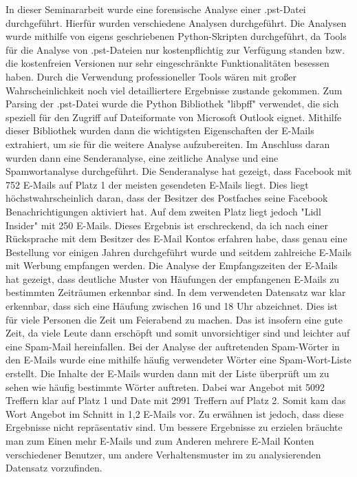 In dieser Seminararbeit wurde eine forensische Analyse einer .pst-Datei durchgeführt. Hierfür wurden verschiedene Analysen durchgeführt. Die Analysen wurde mithilfe von eigens geschriebenen Python-Skripten durchgeführt, da Tools für die Analyse von .pst-Dateien nur kostenpflichtig zur Verfügung standen bzw. die kostenfreien Versionen nur sehr eingeschränkte Funktionalitäten besessen haben. Durch die Verwendung professioneller Tools wären mit großer Wahrscheinlichkeit noch viel detailliertere Ergebnisse zustande gekommen. Zum Parsing der .pst-Datei wurde die Python Bibliothek "libpff" verwendet, die sich speziell für den Zugriff auf Dateiformate von Microsoft Outlook eignet. Mithilfe dieser Bibliothek wurden dann die wichtigsten Eigenschaften der E-Mails extrahiert, um sie für die weitere Analyse aufzubereiten. \newline
Im Anschluss daran wurden dann eine Senderanalyse, eine zeitliche Analyse und eine Spamwortanalyse durchgeführt. Die Senderanalyse hat gezeigt, dass Facebook mit 752 E-Mails auf Platz 1 der meisten gesendeten E-Mails liegt. Dies liegt höchstwahrscheinlich daran, dass der Besitzer des Postfaches seine Facebook Benachrichtigungen aktiviert hat. Auf dem zweiten Platz liegt jedoch "Lidl Insider" mit 250 E-Mails. Dieses Ergebnis ist erschreckend, da ich nach einer Rücksprache mit dem Besitzer des E-Mail Kontos erfahren habe, dass genau eine Bestellung vor einigen Jahren durchgeführt wurde und seitdem zahlreiche E-Mails mit Werbung empfangen werden. Die Analyse der Empfangszeiten der E-Mails hat gezeigt, dass deutliche Muster von Häufungen der empfangenen E-Mails zu bestimmten Zeiträumen erkennbar sind. In dem verwendeten Datensatz war klar erkennbar, dass sich eine Häufung zwischen 16 und 18 Uhr abzeichnet. Dies ist für viele Personen die Zeit um Feierabend zu machen. Das ist insofern eine gute Zeit, da viele Leute dann erschöpft und somit unvorsichtiger sind und leichter auf eine Spam-Mail hereinfallen. Bei der Analyse der auftretenden Spam-Wörter in den E-Mails wurde eine mithilfe häufig verwendeter Wörter eine \glqq{}Spam-Wort-Liste\grqq{} erstellt. Die Inhalte der E-Mails wurden dann mit der Liste überprüft um zu sehen wie häufig bestimmte Wörter auftreten. Dabei war \glqq{}Angebot\grqq{} mit 5092 Treffern klar auf Platz 1 und \glqq{}Date\grqq{} mit 2991 Treffern auf Platz 2. Somit kam das Wort Angebot im Schnitt in 1,2 E-Mails vor. \newline
Zu erwähnen ist jedoch, dass diese Ergebnisse nicht repräsentativ sind. Um bessere Ergebnisse zu erzielen bräuchte man zum Einen mehr E-Mails und zum Anderen mehrere E-Mail Konten verschiedener Benutzer, um andere Verhaltensmuster im zu analysierenden Datensatz vorzufinden.\newpage
